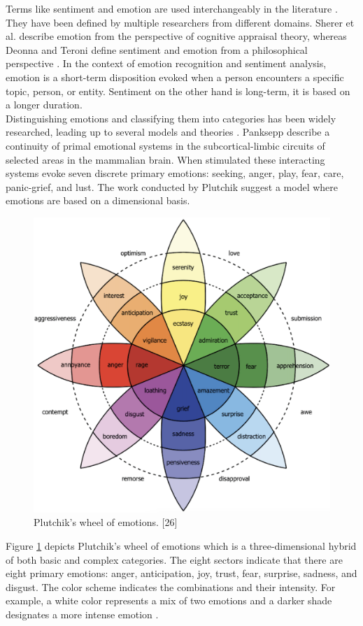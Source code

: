 Terms like sentiment and emotion are used interchangeably in the literature \cite{sentiment_emotion_difference_munezero2014they}. They have been defined by multiple researchers from different domains. Sherer et al. \cite{scherer2005emotions} describe emotion from the perspective of cognitive appraisal theory, whereas Deonna and Teroni \cite{deonna2012emotions} define sentiment and emotion from a philosophical perspective \cite{MSA_review1_SOLEYMANI20173}. In the context of emotion recognition and sentiment analysis, emotion is a short-term disposition evoked when a person encounters a specific topic, person, or entity. Sentiment on the other hand is long-term, it is based on a longer duration.  \\

Distinguishing emotions and classifying them into categories has been widely researched, leading up to several models and theories \cite{HP_RPP} \cite{cross_cultural}. Panksepp \cite{panksepp_book} describe a continuity of primal emotional systems in the subcortical-limbic circuits of selected areas in the mammalian brain. When stimulated these interacting systems evoke seven discrete primary emotions: seeking, anger, play, fear, care, panic-grief, and lust. The work conducted by Plutchik \cite{plutchik_model} suggest a model where emotions are based on a dimensional basis. 
%
\begin{figure}[h]
  \centering
  \includegraphics[width=\textwidth]{figures/plutchiks_model.png}
  \caption{Plutchik's wheel of emotions. [26]}
  \label{fig:plutchik}
\end{figure}
%
Figure \ref{fig:plutchik} depicts Plutchik's wheel of emotions which is a three-dimensional hybrid of both basic and complex categories. The eight sectors indicate that there are eight primary emotions: anger, anticipation, joy, trust, fear, surprise, sadness, and disgust. The color scheme indicates the combinations and their intensity. For example, a white color represents a mix of two emotions and a darker shade designates a more intense emotion \cite{HP_RPP}. \\

